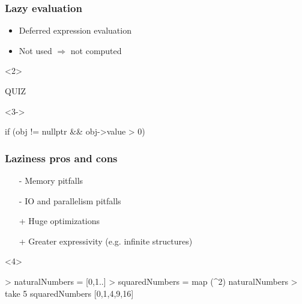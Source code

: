 \documentclass[17pt]{beamer}
\renewcommand{\(}[1]{\begin{columns}[#1]}
\renewcommand{\)}{\end{columns}}
\newcommand{\<}[1]{\begin{column}{#1}}
\renewcommand{\>}{\end{column}}
\begin{document}
\begin{frame}[fragile]
  \frametitle{Lazy evaluation}
  \begin{minipage}[t][.2\textheight]{\textwidth}
  \begin{itemize}
  \item Deferred expression evaluation
  \item Not used $\Rightarrow$ not computed
  \end{itemize}
  \end{minipage}
  \begin{minipage}[c][.5\textheight]{\textwidth}
  \begin{onlyenv}<2>
    \begin{center}
      QUIZ
    \end{center}
  \end{onlyenv}
  \begin{onlyenv}<3->
    \begin{center}
      \begin{ccode}
if (obj != nullptr && obj->value > 0)
      \end{ccode}
    \end{center}
  \end{onlyenv}
  \end{minipage}
\end{frame}

\begin{frame}[fragile]
  \frametitle{Laziness pros and cons}
  \begin{center}
    \begin{itemize}[<+->]
      \item[-] Memory pitfalls
      \item[-] IO and parallelism pitfalls
      \item[+] Huge optimizations
      \item[+] Greater expressivity (e.g. infinite structures)
    \end{itemize}
  \end{center}
  \begin{minipage}[c][.3\textheight]{\textwidth}
    \begin{center}
      \begin{onlyenv}<4>
        \begin{code}
> naturalNumbers = [0,1..]
> squaredNumbers = map (^2) naturalNumbers
> take 5 squaredNumbers
[0,1,4,9,16]
        \end{code}
      \end{onlyenv}
    \end{center}
  \end{minipage}
\end{frame}
\end{document}
